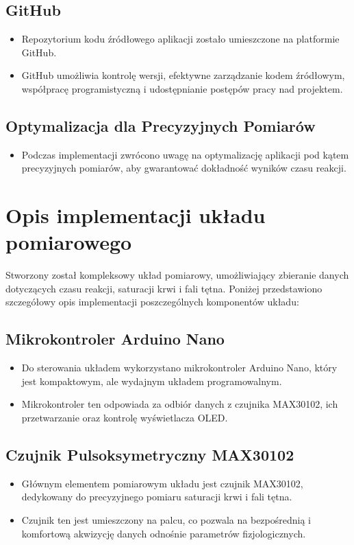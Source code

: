 \subsection{GitHub}
\begin{itemize}
    \item Repozytorium kodu źródłowego aplikacji zostało umieszczone na platformie GitHub.
    \item GitHub umożliwia kontrolę wersji, efektywne zarządzanie kodem źródłowym, współpracę programistyczną i udostępnianie postępów pracy nad projektem.
\end{itemize}
\subsection{Optymalizacja dla Precyzyjnych Pomiarów}
\begin{itemize}
    \item Podczas implementacji zwrócono uwagę na optymalizację aplikacji pod kątem precyzyjnych pomiarów, aby gwarantować dokładność wyników czasu reakcji.
\end{itemize}
\section{Opis implementacji układu pomiarowego}
Stworzony został kompleksowy układ pomiarowy, umożliwiający zbieranie danych dotyczących czasu reakcji, saturacji krwi i fali tętna. Poniżej przedstawiono szczegółowy opis implementacji poszczególnych komponentów układu:
\subsection{Mikrokontroler Arduino Nano}
\begin{itemize}
    \item Do sterowania układem wykorzystano mikrokontroler Arduino Nano, który jest kompaktowym, ale wydajnym układem programowalnym.
    \item Mikrokontroler ten odpowiada za odbiór danych z czujnika MAX30102, ich przetwarzanie oraz kontrolę wyświetlacza OLED.
\end{itemize}
\subsection{Czujnik Pulsoksymetryczny MAX30102}
\begin{itemize}
    \item Głównym elementem pomiarowym układu jest czujnik MAX30102, dedykowany do precyzyjnego pomiaru saturacji krwi i fali tętna.
    \item Czujnik ten jest umieszczony na palcu, co pozwala na bezpośrednią i komfortową akwizycję danych odnośnie parametrów fizjologicznych.
\end{itemize}
